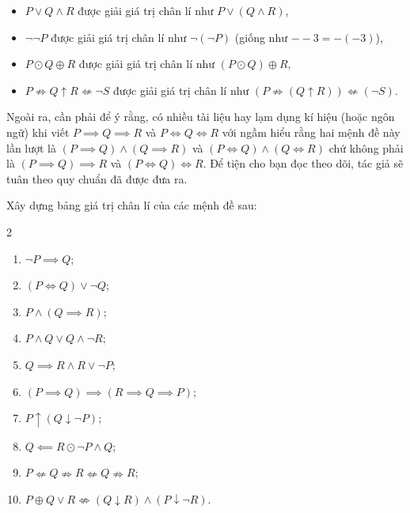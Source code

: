 \begin{itemize}
   \item $P \lor Q \land R$ được giải giá trị chân lí như $P \lor (Q \land R)$,
   \item $\neg \neg P$ được giải giá trị chân lí như $\neg (\neg P)$ (giống như $--3 = -(-3)$),
   \item $P\odot Q \oplus R$ được giải giá trị chân lí như $(P \odot Q) \oplus R$,
   \item $P \nRightarrow Q \uparrow R \nLeftarrow \neg S$ được giải giá trị chân lí như $(P \nRightarrow (Q \uparrow R)) \nLeftarrow (\neg S)$.
\end{itemize}

Ngoài ra, cần phải để ý rằng, có nhiều tài liệu hay lạm dụng kí hiệu (hoặc ngôn ngữ) khi viết $P \implies Q \implies R$ và $P \iff Q \iff R$ với ngầm hiểu rằng hai mệnh đề này lần lượt là $(P \implies Q) \land (Q \implies R)$ và $(P \iff Q) \land (Q \iff R)$ chứ không phải là $(P \implies Q) \implies R$ và $(P \iff Q) \iff R$. Để tiện cho bạn đọc theo dõi, tác giả sẽ tuân theo quy chuẩn đã được đưa ra.

\exercise Xây dựng bảng giá trị chân lí của các mệnh đề sau:
\begin{multicols}{2}
   \begin{enumerate}
      \item $\neg P \implies Q$;
      \item $(P \iff Q) \lor \neg Q$;
      \item $P \land (Q \implies R)$;
      \item $P \land Q \lor Q \land \neg R$;
      \item $Q \implies R \land R \lor \neg P$;
      \item $(P \implies Q) \implies (R \implies Q \implies P)$;
      \item $P \uparrow ( Q \downarrow \neg P )$;
      \item $Q \impliedby R \odot \neg P \land Q$;
      \item $P \nLeftarrow Q \nRightarrow R \nLeftarrow Q \nRightarrow R$;
      \item $P \oplus Q \lor R \nLeftrightarrow (Q \downarrow R) \land (P \downarrow \neg R)$.
   \end{enumerate}
\end{multicols}

\solution

